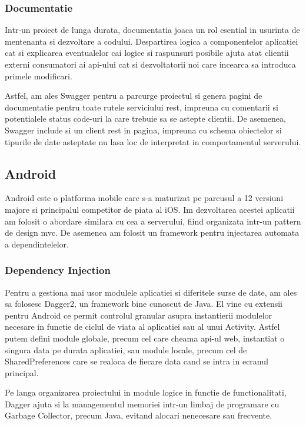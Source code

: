 \subsubsection {Documentatie}

Intr-un proiect de lunga durata, documentatia joaca un rol esential in usurinta de mentenanta si dezvoltare a codului. Despartirea logica a componentelor aplicatiei cat si explicarea eventualelor cai logice si raspunsuri posibile ajuta atat clientii externi consumatori ai \acrshort{api}-ului cat si dezvoltatorii noi care incearca sa introduca primele modificari.

Astfel, am ales Swagger pentru a parcurge proiectul si genera pagini de documentatie pentru toate rutele serviciului \acrshort{rest}, impreuna cu comentarii si potentialele status code-uri la care trebuie sa se astepte clientii. De asemenea, Swagger include si un client \acrshort{rest} in pagina, impreuna cu schema obiectelor si tipurile de date asteptate nu lasa loc de interpretat in comportamentul serverului.

\subsection {Android}

Android este o platforma mobile care s-a maturizat pe parcusul a 12 versiuni majore si principalul competitor de piata al iOS. Im dezvoltarea acestei aplicatii am folosit o abordare similara cu cea a serverului, fiind organizata intr-un pattern de design \acrshort{mvc}. De asemenea am folosit un framework pentru injectarea automata a dependintelelor.

\subsubsection {Dependency Injection}

Pentru a gestiona mai usor modulele aplicatiei si diferitele surse de date, am ales sa folosesc Dagger2, un framework bine cunoscut de Java. El vine cu extensii pentru Android ce permit controlul granular asupra instantierii modulelor necesare in functie de ciclul de viata al aplicatiei sau al unui Activity. Astfel putem defini module globale, precum cel care cheama api-ul web, instantiat o singura data pe durata aplicatiei, sau module locale, precum cel de SharedPreferences care se realoca de fiecare data cand se intra in ecranul principal.

Pe langa organizarea proiectului in module logice in functie de functionalitati, Dagger ajuta si la managementul memoriei intr-un limbaj de programare cu Garbage Collector, precum Java, evitand alocari nenecesare sau frecvente.


